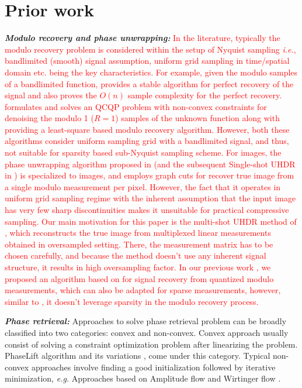 \section{Prior work}
\label{sec:prior}
\emph{\textbf{Modulo recovery and phase unwrapping:}} \textcolor{red}{In the literature, typically the modulo recovery problem is considered within the setup of Nyquist sampling \textit{i.e.}, bandlimited (smooth) signal assumption, uniform grid sampling in time/spatial domain etc. being the key characteristics. For example, given the modulo samples of a bandlimited function, \cite{Bhandari} provides a stable algorithm for perfect recovery of the signal and also proves the $O(n)$ sample complexity for the perfect recovery. \cite{Cucuringu2017} formulates and solves an QCQP problem with non-convex constraints for denoising the modulo 1 ($R =1$) samples of the unknown function along with providing a least-square based modulo recovery algorithm. However, both these algorithms consider uniform sampling grid with a bandlimited signal, and thus, not suitable for sparsity based sub-Nyquist sampling scheme. For images, the phase unwrapping algorithm proposed in \cite{bioucas2007phase} (and the subsequent Single-shot UHDR in \cite{ICCP15_Zhao}) is specialized to images, and employs graph cuts for recover true image from a single modulo measurement per pixel. However, the fact that it operates in uniform grid sampling regime with the inherent assumption that the input image has very few sharp discontinuities makes it unsuitable for practical compressive sampling. Our main motivation for this paper is the multi-shot UHDR method of \cite{ICCP15_Zhao}, which reconstructs the true image from multiplexed linear measurements obtained in oversampled setting. There, the measurement matrix has to be chosen carefully, and because the method doesn't use any inherent signal structure, it results in high oversampling factor. In our previous work \cite{Shah}, we proposed an algorithm based on \cite{ICCP15_Zhao, soltani2017stable} for signal recovery from quantized modulo measurements, which can also be adapted for sparse measurements, however, similar to \cite{ICCP15_Zhao}, it doesn't leverage sparsity in the modulo recovery process.}

\emph{\textbf{Phase retrieval:}} Approaches to solve phase retrieval problem can be broadly classified into two categories: convex and non-convex. 
Convex approach usually consist of solving a constraint optimization problem after linearizing the problem. PhaseLift algorithm \cite{candes2013phaselift} and its variations \cite{gross2017improved}, \cite{candes2015phasediff} come under this category. Typical non-convex approaches involve finding a good initialization followed by iterative minimization, \textit{e.g.} Approaches based on Amplitude flow \cite{wang2016sparse,wang2016solving} and Wirtinger flow \cite{candes2015phase, zhang2016reshaped,  chen2015solving, cai2016optimal}.

